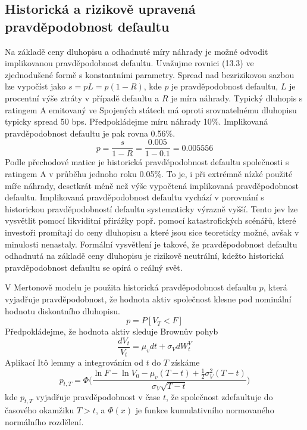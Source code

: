 \documentclass[a4paper]{book}
\begin{document}
\subsection{Historická a rizikově upravená pravděpodobnost defaultu}

Na základě ceny dluhopisu a odhadnuté míry náhrady je možné odvodit implikovanou pravděpodobnost defaultu. Uvažujme rovnici (13.3) ve zjednodušené formě s konstantními parametry. Spread nad bezrizikovou sazbou lze vypočíst jako $s = pL = p(1 - R)$, kde $p$ je pravděpodobnost defaultu, $L$ je procentní výše ztráty v případě defaultu a $R$ je míra náhrady. Typický dluhopis s ratingem A emitovaný ve Spojených státech má oproti srovnatelnému dluhopisu typicky spread 50 bps. Předpokládejme míru náhrady 10\%. Implikovaná pravděpodobnost defaultu je pak rovna 0.56\%.
\begin{equation*}
p = \frac{s}{1 - R} = \frac{0.005}{1 - 0.1} = 0.005556
\end{equation*} 
Podle přechodové matice je historická pravděpodobnost defaultu společnosti s ratingem A v průběhu jednoho roku 0.05\%. To je, i při extrémně nízké použité míře náhrady, desetkrát méně než výše vypočtená implikovaná pravděpodobnost defaultu. Implikovaná pravděpodobnost defaultu vychází v porovnání s historickou pravděpodobností defaultu systematicky výrazně vyšší. Tento jev lze vysvětlit pomocí likviditní přirážky popř. pomocí katastrofických scénářů, které investoři promítají do ceny dluhopisu a které jsou sice teoreticky možné, avšak v minulosti nenastaly. Formální vysvětlení je takové, že pravděpodobnost defaultu odhadnutá na základě ceny dluhopisu je rizikově neutrální, kdežto historická pravděpodobnost defaultu se opírá o reálný svět.

V Mertonově modelu je použita historická pravděpodobnost defaultu $p$, která vyjadřuje pravděpodobnost, že hodnota aktiv společnost klesne pod nominální hodnotu diskontního dluhopisu.
\begin{equation*}
p = P[V_T < F]
\end{equation*}
Předpokládejme, že hodnota aktiv sleduje Brownův pohyb
\begin{equation*}
\frac{d V_t}{V_t} = \mu_v dt + \sigma_V d W_t^V
\end{equation*}
Aplikací It\^o lemmy a integrováním od $t$ do $T$ získáme
\begin{equation}
p_{t,T} = \Phi \Big( \frac{\ln F - \ln V_0 - \mu_v(T-t) + \frac{1}{2}\sigma_V^2(T-t)}{\sigma_V \sqrt{T-t}}\Big)
\end{equation}
kde $p_{t,T}$ vyjadřuje pravděpodobnost v čase $t$, že společnost zdefaultuje do časového okamžiku $T > t$, a $\Phi(x)$ je funkce kumulativního normovaného normálního rozdělení.
\end{document}
